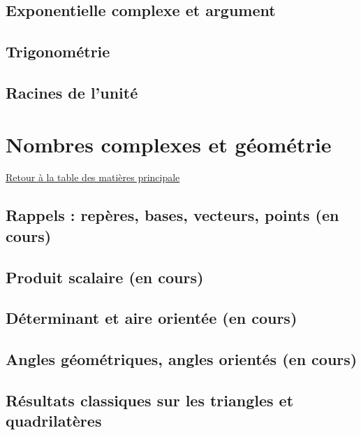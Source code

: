 \documentclass[11pt,a4paper,oneside]{book}
\newcommand{\retourTOC}{Retour à la table des matières principale}
\theoremstyle{definition}
\theoremstyle{plain}
\begin{document}
\section{Exponentielle complexe et argument}
\label{sec:exp}



\section{Trigonométrie}
\label{sec:trigo}



\section{Racines de l'unité}
\label{sec:cyclotomie}



\chapter{Nombres complexes et géométrie}
\minitoc
\hyperlink{toc}{\retourTOC}

\section{Rappels : repères, bases, vecteurs, points (en cours)}
\label{sec:rappels_geom}


\section{Produit scalaire (en cours)}
\label{sec:produit_scalaire}


\section{Déterminant et aire orientée (en cours)}
\label{sec:determinant}


\section{Angles géométriques, angles orientés (en cours)}
\label{sec:angles}


\section{Résultats classiques sur les triangles et quadrilatères}

\end{document}
